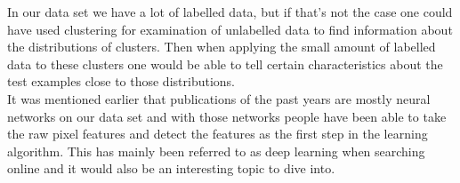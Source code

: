 In our data set we have a lot of labelled data, but if that's not the case one could have used clustering for examination of unlabelled data to find information about the distributions of clusters. Then when applying the small amount of labelled data to these clusters one would be able to tell certain characteristics about the test examples close to those distributions. \\

It was mentioned earlier that publications of the past years are mostly neural networks on our data set and with those networks people have been able to take the raw pixel features and detect the features as the first step in the learning algorithm. This has mainly been referred to as deep learning when searching online and it would also be an interesting topic to dive into.
